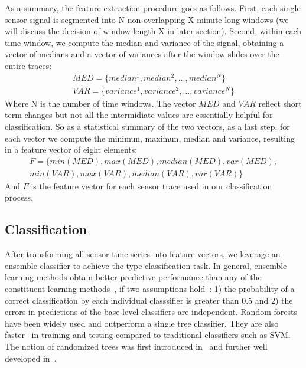 As a summary, the feature extraction procedure goes as follows. First, each single sensor signal is segmented into N
non-overlapping X-minute long windows (we will discuss the decision of window length X in later section). Second, within
each time window, we compute the median and variance of the signal, obtaining a vector of medians and a vector of
variances after the window slides over the entire traces: 
\begin{displaymath}
\begin{split}
MED = \{median^{1}, median^{2}, ..., median^{N}\}\\
VAR = \{variance^{1}, variance^{2}, ..., variance^{N}\}
\end{split}
\end{displaymath}
Where N is the number of time windows. The vector $MED$ and $VAR$ reflect short term changes but not all the intermidiate values are essentially helpful for classification. So as a statistical summary of the two vectors, as a last step, for each vector we compute the minimun, maximun, median and variance, resulting in a feature vector of eight elements:
\begin{displaymath}
\begin{split}
F = \{min(MED), max(MED), median(MED), var(MED),\\
 min(VAR), max(VAR), median(VAR), var(VAR)\}
\end{split}
\end{displaymath}
And $F$ is the feature vector for each sensor trace used in our classification process.

\subsection{Classification}
After transforming all sensor time series into feature vectors, we leverage an ensemble classifier to achieve 
the type classification task. In general, ensemble learning methods obtain better predictive performance than
 any of the constituent learning methods~\cite{ensem1,ensem2}, if two assumptions hold~\cite{ensem3}: 1) the 
 probability of a correct classification by each individual classsifier is greater than 0.5 and 2) the errors
  in predictions of the base-level classifiers are independent. Random forests~\cite{RF} have been widely used 
  and outperform a single tree classifier. They are also faster~\cite{cvpr} in training and testing compared to traditional classifiers such as SVM. The notion of randomized trees was first introduced in~\cite{RT} and further well developed in~\cite{RF}.

